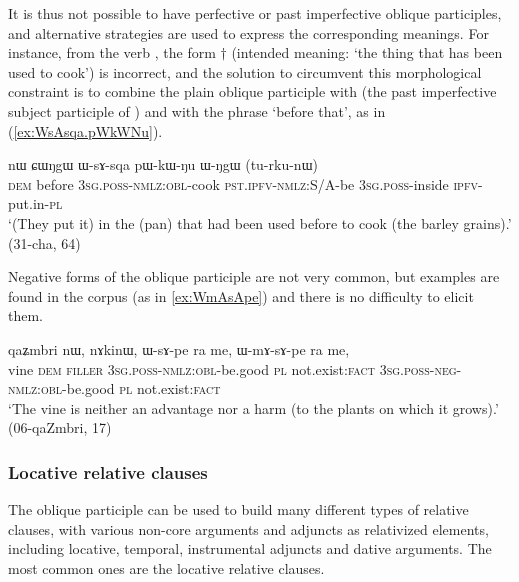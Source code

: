It is thus not possible to have perfective or past imperfective oblique participles, and alternative strategies are used to express the corresponding meanings. For instance, from the verb , the form $\dagger$ (intended meaning: `the thing that has been used to cook') is incorrect, and the solution to circumvent this morphological constraint is to combine the plain oblique participle  with  (the past imperfective subject participle of ) and with the phrase  `before that', as in (\ref{ex:WsAsqa.pWkWNu}).

\begin{exe}
\ex \label{ex:WsAsqa.pWkWNu}
\gll  nɯ ɕɯŋgɯ ɯ-sɤ-sqa pɯ-kɯ-ŋu ɯ-ŋgɯ (tu-rku-nɯ) \\
\textsc{dem} before \textsc{3sg}.\textsc{poss}-\textsc{nmlz}:\textsc{obl}-cook \textsc{pst}.\textsc{ipfv}-\textsc{nmlz}:S/A-be \textsc{3sg}.\textsc{poss}-inside \textsc{ipfv}-put.in-\textsc{pl} \\
\glt `(They put it) in the (pan) that had been used before to cook (the barley grains).' (31-cha, 64)
\end{exe}

Negative forms of the oblique participle are not very common, but examples are found in the corpus (as in \ref{ex:WmAsApe}) and there is no difficulty to elicit them.

\begin{exe}
\ex \label{ex:WmAsApe}
\gll  qaʑmbri nɯ, nɤkinɯ, ɯ-sɤ-pe ra me, ɯ-mɤ-sɤ-pe ra me, \\
vine \textsc{dem} \textsc{filler} \textsc{3sg}.\textsc{poss}-\textsc{nmlz}:\textsc{obl}-be.good \textsc{pl} not.exist:\textsc{fact}  \textsc{3sg}.\textsc{poss}-\textsc{neg}-\textsc{nmlz}:\textsc{obl}-be.good \textsc{pl} not.exist:\textsc{fact} \\
\glt `The vine is neither an advantage nor a harm (to the plants on which it grows).' (06-qaZmbri, 17)
\end{exe}


\subsubsection{Locative relative clauses} \label{sec:locative.participle.relatives}
The oblique participle can be used to build many different types of relative clauses, with various non-core arguments and adjuncts as relativized elements, including locative, temporal, instrumental adjuncts and dative arguments. The most common ones are the locative relative clauses.

